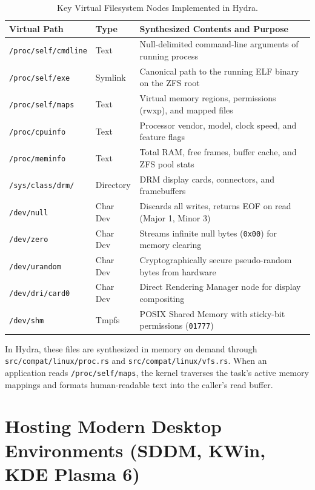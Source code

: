 \begin{table}[htbp]
\centering
\small
\begin{tabular}{lll}
\hline
\textbf{Virtual Path} & \textbf{Type} & \textbf{Synthesized Contents and Purpose} \\
\hline
\texttt{/proc/self/cmdline} & Text & Null-delimited command-line arguments of running process \\
\texttt{/proc/self/exe} & Symlink & Canonical path to the running ELF binary on the ZFS root \\
\texttt{/proc/self/maps} & Text & Virtual memory regions, permissions (rwxp), and mapped files \\
\texttt{/proc/cpuinfo} & Text & Processor vendor, model, clock speed, and feature flags \\
\texttt{/proc/meminfo} & Text & Total RAM, free frames, buffer cache, and ZFS pool stats \\
\texttt{/sys/class/drm/} & Directory & DRM display cards, connectors, and framebuffers \\
\texttt{/dev/null} & Char Dev & Discards all writes, returns EOF on read (Major 1, Minor 3) \\
\texttt{/dev/zero} & Char Dev & Streams infinite null bytes (\texttt{0x00}) for memory clearing \\
\texttt{/dev/urandom} & Char Dev & Cryptographically secure pseudo-random bytes from hardware \\
\texttt{/dev/dri/card0} & Char Dev & Direct Rendering Manager node for display compositing \\
\texttt{/dev/shm} & Tmpfs & POSIX Shared Memory with sticky-bit permissions (\texttt{01777}) \\
\hline
\end{tabular}
\caption{Key Virtual Filesystem Nodes Implemented in Hydra.}
\label{tab:vfs_nodes}
\end{table}

In Hydra, these files are synthesized in memory on demand through \texttt{src/compat/linux/proc.rs} and \texttt{src/compat/linux/vfs.rs}. When an application reads \texttt{/proc/self/maps}, the kernel traverses the task's active memory mappings and formats human-readable text into the caller's read buffer.

\section{Hosting Modern Desktop Environments (SDDM, KWin, KDE Plasma 6)}
\label{sec:hosting_plasma}

